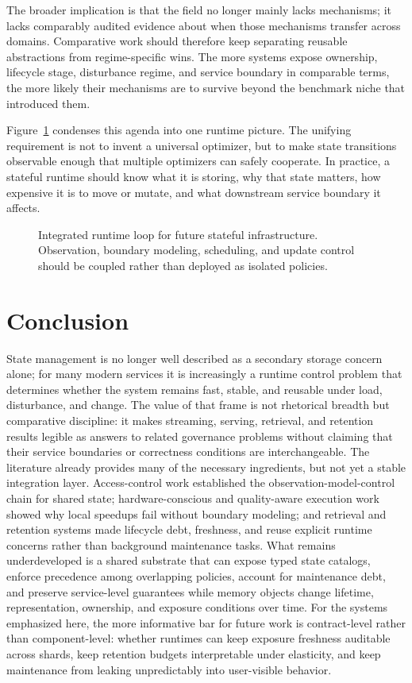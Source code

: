 \documentclass[acmsmall,screen,review]{acmart}
\begin{document}
The broader implication is that the field no longer mainly lacks mechanisms; it lacks comparably audited evidence about when those mechanisms transfer across domains. Comparative work should therefore keep separating reusable abstractions from regime-specific wins. The more systems expose ownership, lifecycle stage, disturbance regime, and service boundary in comparable terms, the more likely their mechanisms are to survive beyond the benchmark niche that introduced them.

Figure~\ref{fig:runtime-loop} condenses this agenda into one runtime picture. The unifying requirement is not to invent a universal optimizer, but to make state transitions observable enough that multiple optimizers can safely cooperate. In practice, a stateful runtime should know what it is storing, why that state matters, how expensive it is to move or mutate, and what downstream service boundary it affects.

\begin{figure}[t]
\centering

\caption{Integrated runtime loop for future stateful infrastructure. Observation, boundary modeling, scheduling, and update control should be coupled rather than deployed as isolated policies.}
\label{fig:runtime-loop}
\end{figure}

\section{Conclusion}
\label{sec:conclusion}

State management is no longer well described as a secondary storage concern alone; for many modern services it is increasingly a runtime control problem that determines whether the system remains fast, stable, and reusable under load, disturbance, and change. The value of that frame is not rhetorical breadth but comparative discipline: it makes streaming, serving, retrieval, and retention results legible as answers to related governance problems without claiming that their service boundaries or correctness conditions are interchangeable. The literature already provides many of the necessary ingredients, but not yet a stable integration layer. Access-control work established the observation-model-control chain for shared state; hardware-conscious and quality-aware execution work showed why local speedups fail without boundary modeling; and retrieval and retention systems made lifecycle debt, freshness, and reuse explicit runtime concerns rather than background maintenance tasks. What remains underdeveloped is a shared substrate that can expose typed state catalogs, enforce precedence among overlapping policies, account for maintenance debt, and preserve service-level guarantees while memory objects change lifetime, representation, ownership, and exposure conditions over time. For the systems emphasized here, the more informative bar for future work is contract-level rather than component-level: whether runtimes can keep exposure freshness auditable across shards, keep retention budgets interpretable under elasticity, and keep maintenance from leaking unpredictably into user-visible behavior.
\end{document}
